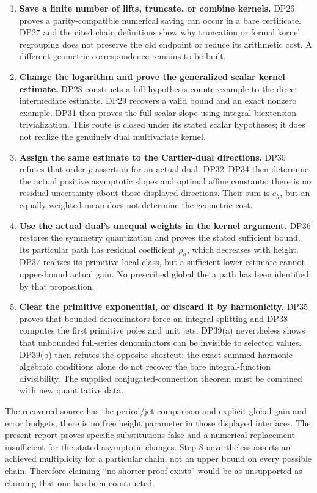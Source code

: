 \documentclass[11pt,a4paper]{article}
\theoremstyle{definition}\newtheorem{remark}[theorem]{Remark}
\begin{document}
\begin{enumerate}[leftmargin=*,label=\arabic*.]
\item \textbf{Save a finite number of lifts, truncate, or combine kernels.} DP26 proves a parity-compatible numerical saving can occur in a bare certificate. DP27 and the cited chain definitions show why truncation or formal kernel regrouping does not preserve the old endpoint or reduce its arithmetic cost. A different geometric correspondence remains to be built.
\item \textbf{Change the logarithm and prove the generalized scalar kernel estimate.} DP28 constructs a full-hypothesis counterexample to the direct intermediate estimate. DP29 recovers a valid bound and an exact nonzero example. DP31 then proves the full scalar slope using integral biextension trivialization. This route is closed under its stated scalar hypotheses; it does not realize the genuinely dual multivariate kernel.
\item \textbf{Assign the same estimate to the Cartier-dual directions.} DP30 refutes that order-$p$ assertion for an actual dual. DP32--DP34 then determine the actual positive asymptotic slopes and optimal affine constants; there is no residual uncertainty about those displayed directions. Their sum is $c_h$, but an equally weighted mean does not determine the geometric cost.
\item \textbf{Use the actual dual's unequal weights in the kernel argument.} DP36 restores the symmetry quantization and proves the stated sufficient bound. Its particular path has residual coefficient $\rho_h$, which decreases with height. DP37 realizes its primitive local class, but a sufficient lower estimate cannot upper-bound actual gain. No prescribed global theta path has been identified by that proposition.
\item \textbf{Clear the primitive exponential, or discard it by harmonicity.} DP35 proves that bounded denominators force an integral splitting and DP38 computes the first primitive poles and unit jets. DP39(a) nevertheless shows that unbounded full-series denominators can be invisible to selected values. DP39(b) then refutes the opposite shortcut: the exact summed harmonic algebraic conditions alone do not recover the bare integral-function divisibility. The supplied conjugated-connection theorem must be combined with new quantitative data.
\end{enumerate}
The recovered source has the period/jet comparison and explicit global gain and error budgets; there is no free height parameter in those displayed interfaces. The present report proves specific substitutions false and a numerical replacement insufficient for the stated asymptotic changes. Step 8 nevertheless asserts an achieved multiplicity for a particular chain, not an upper bound on every possible chain. Therefore claiming ``no shorter proof exists'' would be as unsupported as claiming that one has been constructed.
\end{document}
